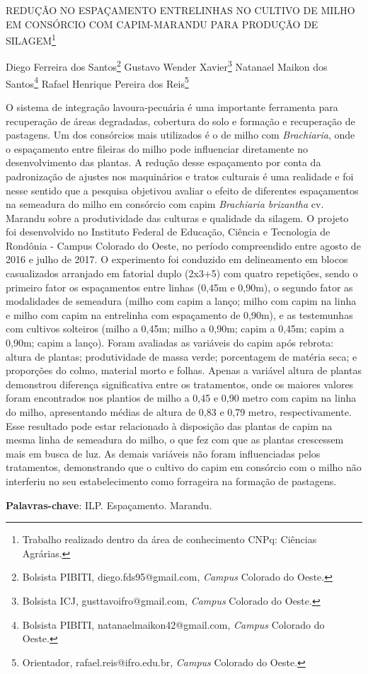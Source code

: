 \documentclass[article,12pt,onesidea,4paper,english,brazil]{abntex2}
\begin{document}
	
	
	\frenchspacing 
	
	\begin{center}
		\LARGE REDUÇÃO NO ESPAÇAMENTO ENTRELINHAS NO CULTIVO DE MILHO EM
		CONSÓRCIO COM CAPIM-MARANDU PARA PRODUÇÃO DE SILAGEM\footnote{Trabalho realizado dentro da área de conhecimento CNPq: Ciências Agrárias.}
		
		\normalsize
		Diego Ferreira dos Santos\footnote{Bolsista PIBITI, diego.fds95@gmail.com, \textit{Campus} Colorado do Oeste.} 
		Gustavo Wender Xavier\footnote{Bolsista ICJ, gusttavoifro@gmail.com, \textit{Campus} Colorado do Oeste.} 
		Natanael Maikon dos Santos\footnote{Bolsista PIBITI, natanaelmaikon42@gmail.com, \textit{Campus} Colorado do Oeste.} 
		Rafael Henrique Pereira dos Reis\footnote{Orientador, rafael.reis@ifro.edu.br, \textit{Campus} Colorado do Oeste.} 
	\end{center}
	
	\noindent O sistema de integração lavoura-pecuária é uma importante ferramenta para
	recuperação de áreas degradadas, cobertura do solo e formação e recuperação de
	pastagens. Um dos consórcios mais utilizados é o de milho com \textit{Brachiaria}, onde o
	espaçamento entre fileiras do milho pode influenciar diretamente no
	desenvolvimento das plantas. A redução desse espaçamento por conta da
	padronização de ajustes nos maquinários e tratos culturais é uma realidade e foi
	nesse sentido que a pesquisa objetivou avaliar o efeito de diferentes espaçamentos
	na semeadura do milho em consórcio com capim \textit{Brachiaria brizantha} cv. Marandu
	sobre a produtividade das culturas e qualidade da silagem. O projeto foi
	desenvolvido no Instituto Federal de Educação, Ciência e Tecnologia de Rondônia -
	Campus Colorado do Oeste, no período compreendido entre agosto de 2016 e julho
	de 2017. O experimento foi conduzido em delineamento em blocos casualizados
	arranjado em fatorial duplo (2x3+5) com quatro repetições, sendo o primeiro fator os
	espaçamentos entre linhas (0,45m e 0,90m), o segundo fator as modalidades de
	semeadura (milho com capim a lanço; milho com capim na linha e milho com capim
	na entrelinha com espaçamento de 0,90m), e as testemunhas com cultivos solteiros
	(milho a 0,45m; milho a 0,90m; capim a 0,45m; capim a 0,90m; capim a lanço).
	Foram avaliadas as variáveis do capim após rebrota: altura de plantas; produtividade
	de massa verde; porcentagem de matéria seca; e proporções do colmo, material
	morto e folhas. Apenas a variável altura de plantas demonstrou diferença
	significativa entre os tratamentos, onde os maiores valores foram encontrados nos
	plantios de milho a 0,45 e 0,90 metro com capim na linha do milho, apresentando
	médias de altura de 0,83 e 0,79 metro, respectivamente. Esse resultado pode estar
	relacionado à disposição das plantas de capim na mesma linha de semeadura do
	milho, o que fez com que as plantas crescessem mais em busca de luz. As demais
	variáveis não foram influenciadas pelos tratamentos, demonstrando que o cultivo do
	capim em consórcio com o milho não interferiu no seu estabelecimento como
	forrageira na formação de pastagens.
	
	\vspace{\onelineskip}
	
	\noindent
	\textbf{Palavras-chave}: ILP. Espaçamento. Marandu.	
	
\end{document}
